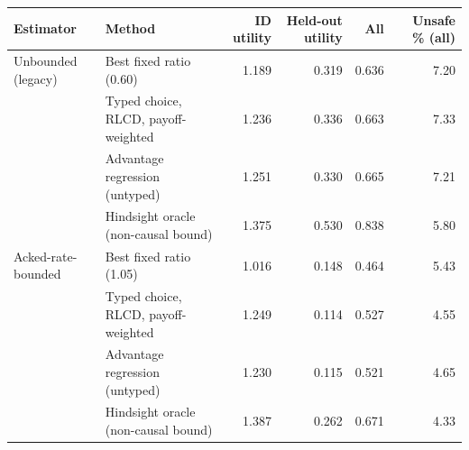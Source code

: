 \begin{tabular}{llrrrr}
\toprule
Estimator & Method & ID utility & Held-out utility & All & Unsafe \% (all) \\
\midrule
Unbounded (legacy) & Best fixed ratio (0.60) & 1.189 & 0.319 & 0.636 & 7.20 \\
 & Typed choice, RLCD, payoff-weighted & 1.236 & 0.336 & 0.663 & 7.33 \\
 & Advantage regression (untyped) & 1.251 & 0.330 & 0.665 & 7.21 \\
 & Hindsight oracle (non-causal bound) & 1.375 & 0.530 & 0.838 & 5.80 \\
\midrule
Acked-rate-bounded & Best fixed ratio (1.05) & 1.016 & 0.148 & 0.464 & 5.43 \\
 & Typed choice, RLCD, payoff-weighted & 1.249 & 0.114 & 0.527 & 4.55 \\
 & Advantage regression (untyped) & 1.230 & 0.115 & 0.521 & 4.65 \\
 & Hindsight oracle (non-causal bound) & 1.387 & 0.262 & 0.671 & 4.33 \\
\bottomrule
\end{tabular}
